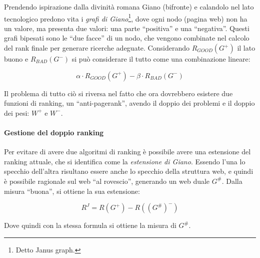 Prendendo ispirazione dalla divinit\`a romana Giano (bifronte) e calandolo nel lato tecnologico predono vita i \textit{grafi di Giano}\footnote{Detto Janus graph.}, dove ogni nodo (pagina web) non ha un valore, ma presenta due valori: una parte ``positiva'' e una ``negativa''. Questi grafi bipesati sono le ``due facce'' di un nodo, che vengono combinate nel calcolo del rank finale per generare ricerche adeguate.
Considerando $R_{GOOD}(G^+)$ il lato buono e $R_{BAD}(G^-)$ si pu\`o considerare il tutto come una combinazione lineare:

\[ \alpha \cdot R_{GOOD}(G^+) - \beta \cdot R_{BAD}(G^-) \]

Il problema di tutto ci\`o si riversa nel fatto che ora dovrebbero esistere due funzioni di ranking, un ``anti-pagerank'', avendo il doppio dei problemi e il doppio dei pesi: $W^+$ e $W^-$.

\paragraph*{Gestione del doppio ranking}Per evitare di avere due algoritmi di ranking \`e possibile avere una estensione del ranking attuale, che si identifica come la \textit{estensione di Giano}. Essendo l'una lo specchio dell'altra risultano essere anche lo specchio della struttura web, e quindi \`e possibile ragionale sul web ``al rovescio'', generando un web duale $G^\#$. Dalla misura ``buona'', si ottiene la sua estensione:

\[ R^J = R(G^+)-R((G^\#)^-) \]

Dove quindi con la stessa formula si ottiene la misura di $G^\#$.
